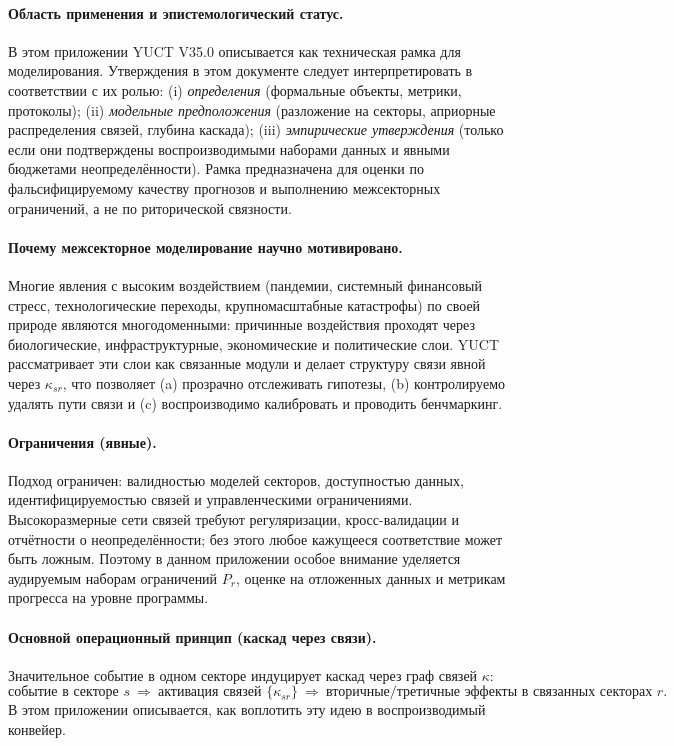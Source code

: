 \documentclass[11pt,a4paper]{article}
\begin{document}
	\paragraph{Область применения и эпистемологический статус.}
	В этом приложении YUCT V35.0 описывается как техническая рамка для моделирования. Утверждения в этом документе следует интерпретировать в соответствии с их ролью:
	(i) \emph{определения} (формальные объекты, метрики, протоколы);
	(ii) \emph{модельные предположения} (разложение на секторы, априорные распределения связей, глубина каскада);
	(iii) \emph{эмпирические утверждения} (только если они подтверждены воспроизводимыми наборами данных и явными бюджетами неопределённости).
	Рамка предназначена для оценки по фальсифицируемому качеству прогнозов и выполнению межсекторных ограничений, а не по риторической связности.
	
	\paragraph{Почему межсекторное моделирование научно мотивировано.}
	Многие явления с высоким воздействием (пандемии, системный финансовый стресс, технологические переходы, крупномасштабные катастрофы) по своей природе являются многодоменными: причинные воздействия проходят через биологические, инфраструктурные, экономические и политические слои. YUCT рассматривает эти слои как связанные модули и делает структуру связи явной через $\kappa_{sr}$, что позволяет (a) прозрачно отслеживать гипотезы, (b) контролируемо удалять пути связи и (c) воспроизводимо калибровать и проводить бенчмаркинг.
	
	\paragraph{Ограничения (явные).}
	Подход ограничен: валидностью моделей секторов, доступностью данных, идентифицируемостью связей и управленческими ограничениями. Высокоразмерные сети связей требуют регуляризации, кросс-валидации и отчётности о неопределённости; без этого любое кажущееся соответствие может быть ложным. Поэтому в данном приложении особое внимание уделяется аудируемым наборам ограничений $P_r$, оценке на отложенных данных и метрикам прогресса на уровне программы.
	
	\paragraph{Основной операционный принцип (каскад через связи).}
	Значительное событие в одном секторе индуцирует каскад через граф связей $\kappa$:
	\[
	\text{событие в секторе }s \ \Rightarrow\ \text{активация связей }\{\kappa_{sr}\}\ \Rightarrow\ \text{вторичные/третичные эффекты в связанных секторах }r.
	\]
	В этом приложении описывается, как воплотить эту идею в воспроизводимый конвейер.
	
\end{document}
